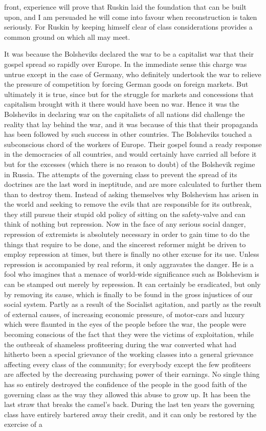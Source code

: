 \documentclass{book}
\begin{document}
front, experience will prove that Ruskin laid the foundation that can be built upon, and I am persuaded he will come into favour when reconstruction is taken seriously. For Ruskin by keeping himself clear of class considerations provides a common ground on which all may meet.

It was because the Bolsheviks declared the war to be a capitalist war that their gospel spread so rapidly over Europe. In the immediate sense this charge was untrue except in the case of Germany, who definitely undertook the war to relieve the pressure of competition by forcing German goods on foreign markets. But ultimately it is true, since but for the struggle for markets and concessions that capitalism brought with it there would have been no war. Hence it was the Bolsheviks in declaring war on the capitalists of all nations did challenge the reality that lay behind the war, and it was because of this that their propaganda has been followed by such success in other countries. The Bolsheviks touched a subconscious chord of the workers of Europe. Their gospel found a ready response in the democracies of all countries, and would certainly have carried all before it but for the excesses (which there is no reason to doubt) of the Bolshevik regime in Russia. The attempts of the governing class to prevent the spread of its doctrines are the last word in ineptitude, and are more calculated to further them than to destroy them. Instead of asking themselves why Bolshevism has arisen in the world and seeking to remove the evils that are responsible for its outbreak, they still pursue their stupid old policy of sitting on the safety-valve and can think of nothing but repression. Now in the face of any serious social danger, repression of extremists is absolutely necessary in order to gain time to do the things that require to be done, and the sincerest reformer might be driven to employ repression at times, but there is finally no other excuse for its use. Unless repression is accompanied by real reform, it only aggravates the danger. He is a fool who imagines that a menace of world-wide significance such as Bolshevism is can be stamped out merely by repression. It can certainly be eradicated, but only by removing its cause, which is finally to be found in the gross injustices of our social system. Partly as a result of the Socialist agitation, and partly as the result of external causes, of increasing economic pressure, of motor-cars and luxury which were flaunted in the eyes of the people before the war, the people were becoming conscious of the fact that they were the victims of exploitation, while the outbreak of shameless profiteering during the war converted what had hitherto been a special grievance of the working classes into a general grievance affecting every class of the community; for everybody except the few profiteers are affected by the decreasing purchasing power of their earnings. No single thing has so entirely destroyed the confidence of the people in the good faith of the governing class as the way they allowed this abuse to grow up. It has been the last straw that breaks the camel’s back. During the last ten years the governing class have entirely bartered away their credit, and it can only be restored by the exercise of a 
\end{document}
